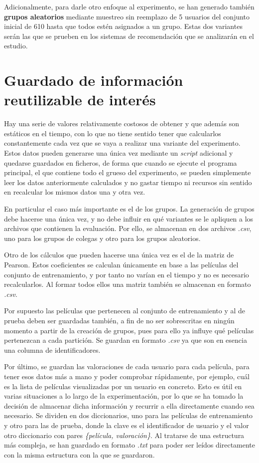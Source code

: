 Adicionalmente, para darle otro enfoque al experimento, se han generado también \textbf{grupos aleatorios} mediante muestreo sin reemplazo de 5 usuarios del conjunto inicial de 610 hasta que todos estén asignados a un grupo. Estas dos variantes serán las que se prueben en los sistemas de recomendación que se analizarán en el estudio.

\section{Guardado de información reutilizable de interés}

Hay una serie de valores relativamente costosos de obtener y que además son estáticos en el tiempo, con lo que no tiene sentido tener que calcularlos constantemente cada vez que se vaya a realizar una variante del experimento. Estos datos pueden generarse una única vez mediante un \textit{script} adicional y quedarse guardados en ficheros, de forma que cuando se ejecute el programa principal, el que contiene todo el grueso del experimento, se pueden simplemente leer los datos anteriormente calculados y no gastar tiempo ni recursos sin sentido en recalcular los mismos datos una y otra vez.

En particular el caso más importante es el de los grupos. La generación de grupos debe hacerse una única vez, y no debe influir en qué variantes se le apliquen a los archivos que contienen la evaluación. Por ello, se almacenan en dos archivos \textit{.csv}, uno para los grupos de colegas y otro para los grupos aleatorios.

Otro de los cálculos que pueden hacerse una única vez es el de la matriz de Pearson. Estos coeficientes se calculan únicamente en base a las películas del conjunto de entrenamiento, y por tanto no varían en el tiempo y no es necesario recalcularlos. Al formar todos ellos una matriz también se almacenan en formato \textit{.csv}.

Por supuesto las películas que pertenecen al conjunto de entrenamiento y al de prueba deben ser guardadas también, a fin de no ser sobrescritas en ningún momento a partir de la creación de grupos, pues para ello ya influye qué películas pertenezcan a cada partición. Se guardan en formato \textit{.csv} ya que son en esencia una columna de identificadores.

Por último, se guardan las valoraciones de cada usuario para cada película, para tener esos datos más a mano y poder comprobar rápidamente, por ejemplo, cuál es la lista de películas visualizadas por un usuario en concreto. Esto es útil en varias situaciones a lo largo de la experimentación, por lo que se ha tomado la decisión de almacenar dicha información y recurrir a ella directamente cuando sea necesario. Se dividen en dos diccionarios, uno para las películas de entrenamiento y otro para las de prueba, donde la clave es el identificador de usuario y el valor otro diccionario con pares \textit{\{película, valoración\}}. Al tratarse de una estructura más compleja, se han guardado en formato \textit{.txt} para poder ser leídos directamente con la misma estructura con la que se guardaron.

